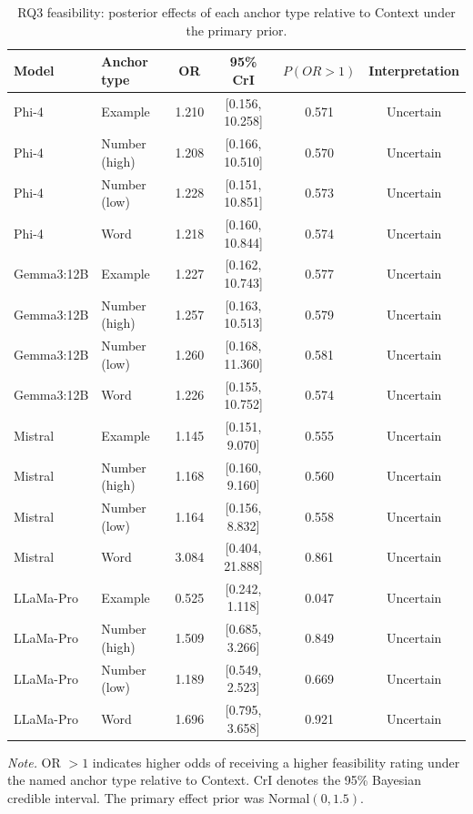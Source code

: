 \begin{table}[tbp]
\caption{RQ3 feasibility: posterior effects of each anchor type relative to Context under the primary prior.}
\label{tab:rq3_feasibility_bayesian}
\begin{tabular}{llcccc}
\toprule
Model & Anchor type & OR & 95\% CrI & $P(OR>1)$ & Interpretation \\
\midrule
Phi-4 & Example & 1.210 & [0.156, 10.258] & 0.571 & Uncertain \\
Phi-4 & Number (high) & 1.208 & [0.166, 10.510] & 0.570 & Uncertain \\
Phi-4 & Number (low) & 1.228 & [0.151, 10.851] & 0.573 & Uncertain \\
Phi-4 & Word & 1.218 & [0.160, 10.844] & 0.574 & Uncertain \\
Gemma3:12B & Example & 1.227 & [0.162, 10.743] & 0.577 & Uncertain \\
Gemma3:12B & Number (high) & 1.257 & [0.163, 10.513] & 0.579 & Uncertain \\
Gemma3:12B & Number (low) & 1.260 & [0.168, 11.360] & 0.581 & Uncertain \\
Gemma3:12B & Word & 1.226 & [0.155, 10.752] & 0.574 & Uncertain \\
Mistral & Example & 1.145 & [0.151, 9.070] & 0.555 & Uncertain \\
Mistral & Number (high) & 1.168 & [0.160, 9.160] & 0.560 & Uncertain \\
Mistral & Number (low) & 1.164 & [0.156, 8.832] & 0.558 & Uncertain \\
Mistral & Word & 3.084 & [0.404, 21.888] & 0.861 & Uncertain \\
LLaMa-Pro & Example & 0.525 & [0.242, 1.118] & 0.047 & Uncertain \\
LLaMa-Pro & Number (high) & 1.509 & [0.685, 3.266] & 0.849 & Uncertain \\
LLaMa-Pro & Number (low) & 1.189 & [0.549, 2.523] & 0.669 & Uncertain \\
LLaMa-Pro & Word & 1.696 & [0.795, 3.658] & 0.921 & Uncertain \\
\bottomrule
\end{tabular}
\vspace{2pt}
\begin{minipage}{\linewidth}
\footnotesize\textit{Note.} OR $>1$ indicates higher odds of receiving a higher feasibility rating under the named anchor type relative to Context. CrI denotes the 95\% Bayesian credible interval. The primary effect prior was Normal$(0,1.5)$.
\end{minipage}
\end{table}
